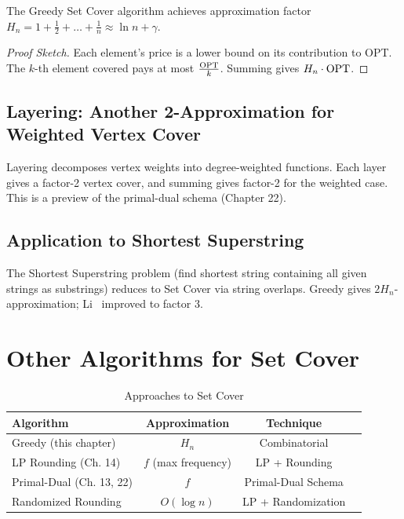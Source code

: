 \begin{theorem}
The Greedy Set Cover algorithm achieves approximation factor $H_n = 1 + \frac{1}{2} + \dots + \frac{1}{n} \approx \ln n + \gamma$.
\end{theorem}
\begin{proof}[Proof Sketch]
Each element's price is a lower bound on its contribution to OPT. The $k$-th element covered pays at most $\frac{\mathrm{OPT}}{k}$. Summing gives $H_n \cdot \mathrm{OPT}$.
\end{proof}

\subsection{Layering: Another 2-Approximation for Weighted Vertex Cover}

Layering decomposes vertex weights into degree-weighted functions. Each layer gives a factor-2 vertex cover, and summing gives factor-2 for the weighted case. This is a preview of the primal-dual schema (Chapter 22).

\subsection{Application to Shortest Superstring}

The Shortest Superstring problem (find shortest string containing all given strings as substrings) reduces to Set Cover via string overlaps. Greedy gives $2H_n$-approximation; Li~\cite{li92} improved to factor 3.

\section{Other Algorithms for Set Cover}

\begin{table}[H]
\centering
\caption{Approaches to Set Cover}
\begin{tabular}{lccc}
\toprule
Algorithm & Approximation & Technique \\
\midrule
Greedy (this chapter) & $H_n$ & Combinatorial \\
LP Rounding (Ch. 14) & $f$ (max frequency) & LP + Rounding \\
Primal-Dual (Ch. 13, 22) & $f$ & Primal-Dual Schema \\
Randomized Rounding & $O(\log n)$ & LP + Randomization \\
\bottomrule
\end{tabular}
\end{table}

